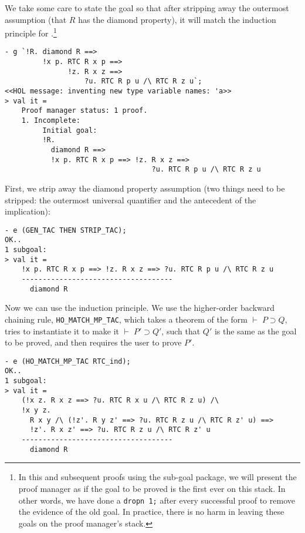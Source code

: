 We take some care to state the goal so that after stripping away the
outermost assumption (that $R$ has the diamond property), it will match the
induction principle for .\footnote{In this and subsequent
  proofs using the sub-goal package, we will present the proof manager
  as if the goal to be proved is the first ever on this stack.  In
  other words, we have done a \texttt{dropn 1;} after every successful
  proof to remove the evidence of the old goal.  In practice, there is
  no harm in leaving these goals on the proof manager's stack.}
\begin{session}
\begin{verbatim}
- g `!R. diamond R ==>
         !x p. RTC R x p ==>
               !z. R x z ==>
                   ?u. RTC R p u /\ RTC R z u`;
<<HOL message: inventing new type variable names: 'a>>
> val it =
    Proof manager status: 1 proof.
    1. Incomplete:
         Initial goal:
         !R.
           diamond R ==>
           !x p. RTC R x p ==> !z. R x z ==>
                                   ?u. RTC R p u /\ RTC R z u
\end{verbatim}
\end{session}
First, we strip away the diamond property assumption (two things need to
be stripped: the outermost universal quantifier and the antecedent of
the implication):
\begin{session}
\begin{verbatim}
- e (GEN_TAC THEN STRIP_TAC);
OK..
1 subgoal:
> val it =
    !x p. RTC R x p ==> !z. R x z ==> ?u. RTC R p u /\ RTC R z u
    ------------------------------------
      diamond R
\end{verbatim}
\end{session}
Now we can use the induction principle.  We use the higher-order
backward chaining rule, \texttt{HO\_MATCH\_MP\_TAC}, which takes a
theorem of the form $\vdash\;P\supset Q$, tries to instantiate it to
make it $\vdash\;P'\supset Q'$, such that $Q'$ is the same as the goal
to be proved, and then requires the user to prove $P'$.
\begin{session}
\begin{verbatim}
- e (HO_MATCH_MP_TAC RTC_ind);
OK..
1 subgoal:
> val it =
    (!x z. R x z ==> ?u. RTC R x u /\ RTC R z u) /\
    !x y z.
      R x y /\ (!z'. R y z' ==> ?u. RTC R z u /\ RTC R z' u) ==>
      !z'. R x z' ==> ?u. RTC R z u /\ RTC R z' u
    ------------------------------------
      diamond R
\end{verbatim}
\end{session}
